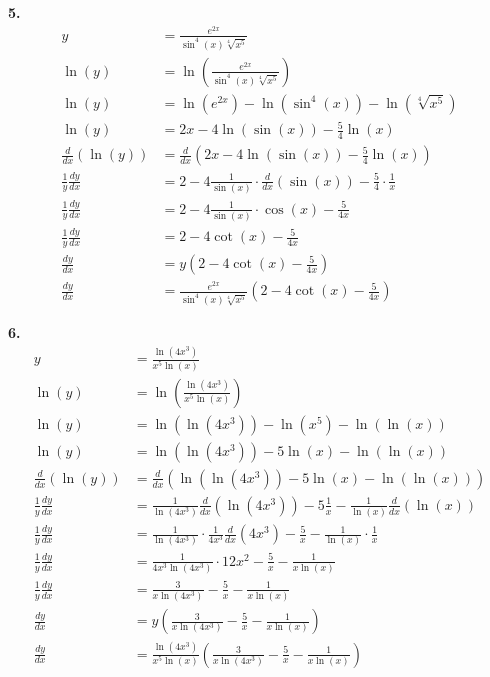 \documentclass[10pt,oneside,]{book}
\theoremstyle{plain}
\theoremstyle{definition}
\numberwithin{equation}{section}
\newcommand{\fe}[2]{#1\mathopen{}\left(#2\right)\mathclose{}}
\newcommand{\lz}[2]{\frac{d#1}{d#2}}
\newcommand{\lzoo}[2]{{\frac{d}{d#1}}{\left(#2\right)}}
\begin{document}
\par\smallskip
\noindent\textbf{5.}\quad{}\begin{align*}
y&=\frac{e^{2x}}{\fe{\sin^4}{x}\sqrt[4]{x^5}}\\
\fe{\ln}{y}&=\fe{\ln}{\frac{e^{2x}}{\fe{\sin^4}{x}\sqrt[4]{x^5}}}\\
\fe{\ln}{y}&=\fe{\ln}{e^{2x}}-\fe{\ln}{\fe{\sin^4}{x}}-\fe{\ln}{\sqrt[4]{x^5}}\\
\fe{\ln}{y}&=2x-4\fe{\ln}{\fe{\sin}{x}}-\frac{5}{4}\fe{\ln}{x}\\
\lzoo{x}{\fe{\ln}{y}}&=\lzoo{x}{2x-4\fe{\ln}{\fe{\sin}{x}}-\frac{5}{4}\fe{\ln}{x}}\\
\frac{1}{y}\lz{y}{x}&=2-4\frac{1}{\fe{\sin}{x}}\cdot\lzoo{x}{\fe{\sin}{x}}-\frac{5}{4}\cdot\frac{1}{x}\\
\frac{1}{y}\lz{y}{x}&=2-4\frac{1}{\fe{\sin}{x}}\cdot\fe{\cos}{x}-\frac{5}{4x}\\
\frac{1}{y}\lz{y}{x}&=2-4\fe{\cot}{x}-\frac{5}{4x}\\
\lz{y}{x}&=y\left(2-4\fe{\cot}{x}-\frac{5}{4x}\right)\\
\lz{y}{x}&=\frac{e^{2x}}{\fe{\sin^4}{x}\sqrt[4]{x^5}}\left(2-4\fe{\cot}{x}-\frac{5}{4x}\right)
\end{align*}%
\par\smallskip
\noindent\textbf{6.}\quad{}\begin{align*}
y&=\frac{\fe{\ln}{4x^3}}{x^5\fe{\ln}{x}}\\
\fe{\ln}{y}&=\fe{\ln}{\frac{\fe{\ln}{4x^3}}{x^5\fe{\ln}{x}}}\\
\fe{\ln}{y}&=\fe{\ln}{\fe{\ln}{4x^3}}-\fe{\ln}{x^5}-\fe{\ln}{\fe{\ln}{x}}\\
\fe{\ln}{y}&=\fe{\ln}{\fe{\ln}{4x^3}}-5\fe{\ln}{x}-\fe{\ln}{\fe{\ln}{x}}\\
\lzoo{x}{\fe{\ln}{y}}&=\lzoo{x}{\fe{\ln}{\fe{\ln}{4x^3}}-5\fe{\ln}{x}-\fe{\ln}{\fe{\ln}{x}}}\\
\frac{1}{y}\lz{y}{x}&=\frac{1}{\fe{\ln}{4x^3}}\lzoo{x}{\fe{\ln}{4x^3}}-5\frac{1}{x}-\frac{1}{\fe{\ln}{x}}\lzoo{x}{\fe{\ln}{x}}\\
\frac{1}{y}\lz{y}{x}&=\frac{1}{\fe{\ln}{4x^3}}\cdot\frac{1}{4x^3}\lzoo{x}{4x^3}-\frac{5}{x}-\frac{1}{\fe{\ln}{x}}\cdot\frac{1}{x}\\
\frac{1}{y}\lz{y}{x}&=\frac{1}{4x^3\fe{\ln}{4x^3}}\cdot12x^2-\frac{5}{x}-\frac{1}{x\fe{\ln}{x}}\\
\frac{1}{y}\lz{y}{x}&=\frac{3}{x\fe{\ln}{4x^3}}-\frac{5}{x}-\frac{1}{x\fe{\ln}{x}}\\
\lz{y}{x}&=y\left(\frac{3}{x\fe{\ln}{4x^3}}-\frac{5}{x}-\frac{1}{x\fe{\ln}{x}}\right)\\
\lz{y}{x}&=\frac{\fe{\ln}{4x^3}}{x^5\fe{\ln}{x}}\left(\frac{3}{x\fe{\ln}{4x^3}}-\frac{5}{x}-\frac{1}{x\fe{\ln}{x}}\right)
\end{align*}%
\par\smallskip
\end{document}
